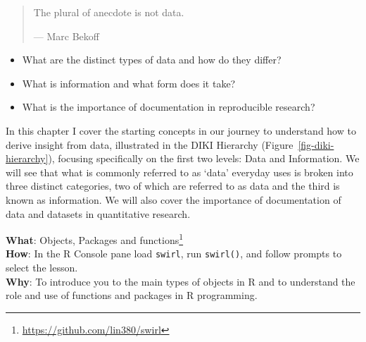 \documentclass[
  letterpaper,
]{scrbook}
\providecommand{\tightlist}{%
  \setlength{\itemsep}{0pt}\setlength{\parskip}{0pt}}\usepackage{longtable,booktabs,array}
\DeclareRobustCommand{\href}[2]{#2\footnote{\url{#1}}}
\begin{document}
\begin{quote}
The plural of anecdote is not data.

--- Marc Bekoff
\end{quote}

\begin{tcolorbox}[enhanced jigsaw, title=\textcolor{quarto-callout-note-color}{\faInfo}\hspace{0.5em}{Keys}, titlerule=0mm, toptitle=1mm, colbacktitle=quarto-callout-note-color!10!white, bottomtitle=1mm, left=2mm, colframe=quarto-callout-note-color-frame, breakable, toprule=.15mm, colback=white, opacitybacktitle=0.6, leftrule=.75mm, rightrule=.15mm, bottomrule=.15mm, arc=.35mm, coltitle=black, opacityback=0]

\begin{itemize}
\tightlist
\item
  What are the distinct types of data and how do they differ?
\item
  What is information and what form does it take?
\item
  What is the importance of documentation in reproducible research?
\end{itemize}

\end{tcolorbox}

In this chapter I cover the starting concepts in our journey to
understand how to derive insight from data, illustrated in the DIKI
Hierarchy (Figure~\ref{fig-diki-hierarchy}), focusing specifically on
the first two levels: Data and Information. We will see that what is
commonly referred to as `data' everyday uses is broken into three
distinct categories, two of which are referred to as data and the third
is known as information. We will also cover the importance of
documentation of data and datasets in quantitative research.

\begin{tcolorbox}[enhanced jigsaw, title=\textcolor{quarto-callout-tip-color}{\faLightbulb}\hspace{0.5em}{Swirl}, titlerule=0mm, toptitle=1mm, colbacktitle=quarto-callout-tip-color!10!white, bottomtitle=1mm, left=2mm, colframe=quarto-callout-tip-color-frame, breakable, toprule=.15mm, colback=white, opacitybacktitle=0.6, leftrule=.75mm, rightrule=.15mm, bottomrule=.15mm, arc=.35mm, coltitle=black, opacityback=0]

\textbf{What}: \href{https://github.com/lin380/swirl}{Objects, Packages
and functions}\\
\textbf{How}: In the R Console pane load \texttt{swirl}, run
\texttt{swirl()}, and follow prompts to select the lesson.\\
\textbf{Why}: To introduce you to the main types of objects in R and to
understand the role and use of functions and packages in R programming.

\end{tcolorbox}
\end{document}

